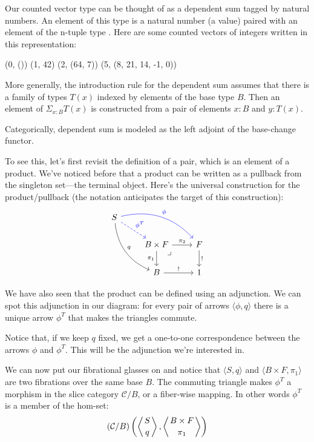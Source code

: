 \documentclass[DaoFP]{subfiles}
\begin{document}
Our counted vector type can be thought of as a dependent sum tagged by natural numbers. An element of this type is a natural number   (a value) paired with an element of the n-tuple type . Here are some counted vectors of integers written in this representation:
\begin{haskell}
(0, ())
(1, 42)
(2, (64, 7))
(5, (8, 21, 14, -1, 0))
\end{haskell}

More generally, the introduction rule for the dependent sum assumes that there is a family of types $T(x)$ indexed by elements of the base type $B$. Then an element of $\Sigma_{x : B} T(x)$ is constructed from a pair of elements $x \colon B$ and $y \colon T(x)$. 

Categorically, dependent sum is modeled as the left adjoint of the base-change functor. 

To see this, let's first revisit the definition of a pair, which is an element of a product. We've noticed before that a product can be written as a pullback from the singleton set---the terminal object. Here's the universal construction for the product/pullback (the notation anticipates the target of this construction):
\[
 \begin{tikzcd}
 S
 \arrow[dr, blue, dashed, "\phi^T"]
 \arrow[drr, blue, bend left, "\phi"]
 \arrow[ddr, bend right, "q"]
 \\
 &B \times F
\arrow[dr, phantom,  , very near start, "\lrcorner"]
 \arrow[r, "\pi_2"]
 \arrow[d, "\pi_1"']
 &F
 \arrow[d, "!"]
 \\
 &B
 \arrow[r, "!"]
 &1
  \end{tikzcd}
\]

We have also seen that the product can be defined using an adjunction. We can spot this adjunction in our diagram: for every pair of arrows $\langle \phi, q \rangle$ there is a unique arrow $\phi^T$ that makes the triangles commute. 

Notice that, if we keep $q$ fixed, we get a one-to-one correspondence between the arrows $\phi$ and $\phi^T$. This will be the adjunction we're interested in.

We can now put our fibrational glasses on and notice that $\langle S, q\rangle$ and $\langle B \times F, \pi_1 \rangle$ are two fibrations over the same base $B$. The commuting triangle makes $\phi^T$ a morphism in the slice category $\mathcal{C}/B$, or a fiber-wise mapping. In other words $\phi^T$ is a member of the hom-set:
 \[ (\mathcal{C}/B) \left(\left \langle {S \atop q} \right \rangle, \left \langle {B \times F \atop \pi_1} \right \rangle \right)  \]
 
\end{document}
